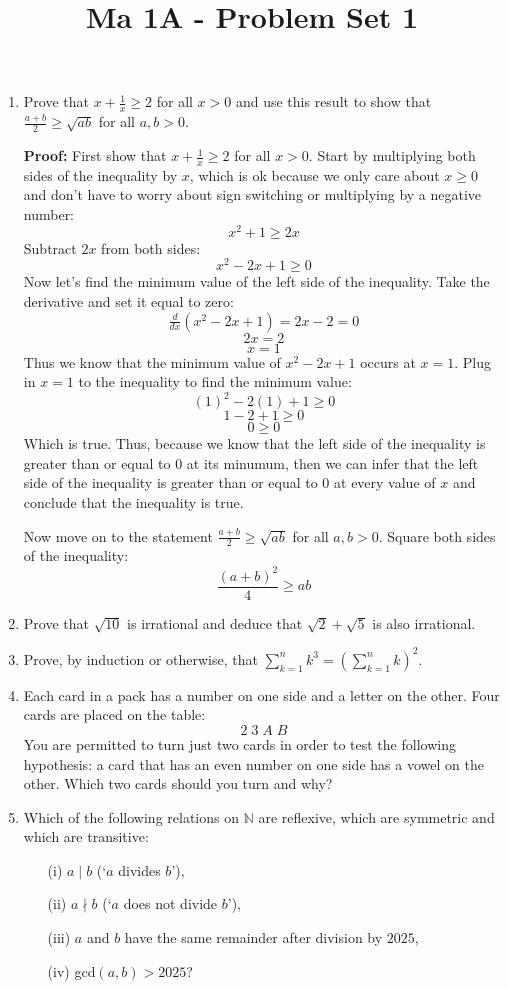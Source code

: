 \documentclass[11pt]{article}
\title{\vspace{-0.7cm}Ma 1A - Problem Set 1}
\date{}
\begin{document}
\maketitle

\begin{enumerate}

\item
Prove that $x + \frac 1x \geq 2$ for all $x > 0$ and use this result to show that $\frac{a+b}{2} \geq \sqrt{ab}$ for all $a, b > 0$.

\bigskip 
\textbf{Proof: } First show that $x + \frac 1x \geq 2$ for all $x > 0$. Start by multiplying both sides of the inequality by $x$, which is ok because we only care about $x\geq 0$ and don't have to worry about sign switching or multiplying by a negative number: 
\[x^2 + 1 \geq 2x\]
Subtract $2x$ from both sides: 
\[x^2 -2x + 1 \geq 0 \]
Now let's find the minimum value of the left side of the inequality. Take the derivative and set it equal to zero: 
\[\tfrac{d}{dx} (x^2-2x+1 )= 2x -2 = 0 \]
\[2x = 2 \]
\[x = 1 \]
Thus we know that the minimum value of $x^2 - 2x + 1$ occurs at $x = 1$. Plug in $x = 1$ to the inequality to find the minimum value: 
\[(1)^2 - 2(1) +1 \geq 0 \]
\[ 1 - 2 + 1 \geq 0\]
\[0 \geq 0 \]
Which is true. Thus, because we know that the left side of the inequality is greater than or equal to $0$ at its minumum, then we can infer that the left side of the inequality is greater than or equal to $0$ at every value of $x$ and conclude that the inequality is true. 

\medskip

Now move on to the statement $\frac{a+b}{2} \geq \sqrt{ab}$ for all $a, b > 0$. Square both sides of the inequality: 
\[\frac{(a+b)^2}{4} \geq ab \]



\item
Prove that $\sqrt{10}$ is irrational and deduce that $\sqrt{2} + \sqrt{5}$ is also irrational.

\item
Prove, by induction or otherwise, that $\sum_{k=1}^n k^3 = \left(\sum_{k=1}^n k\right)^2$.

\item
Each card in a pack has a number on one side and a letter on the other. Four cards are
placed on the table:
\[ \boxed{2} \; \boxed{3} \; \boxed{A} \; \boxed{B}\]
You are permitted to turn just two cards in order to test the following hypothesis: a card that
has an even number on one side has a vowel on the other. Which two cards should you turn and why? 

\item
Which of the following relations on $\mathbb{N}$ are reflexive, which are symmetric and which are transitive:
\begin{itemize}
\item[(i)] $a \mid b$ (`$a$ divides $b$'),
\item[(ii)] $a \nmid b$ (`$a$ does not divide $b$'),
\item[(iii)] $a$ and $b$ have the same remainder after division by $2025$,
\item[(iv)] gcd$(a, b) > 2025$?
\end{itemize}

\end{enumerate}
\end{document}
